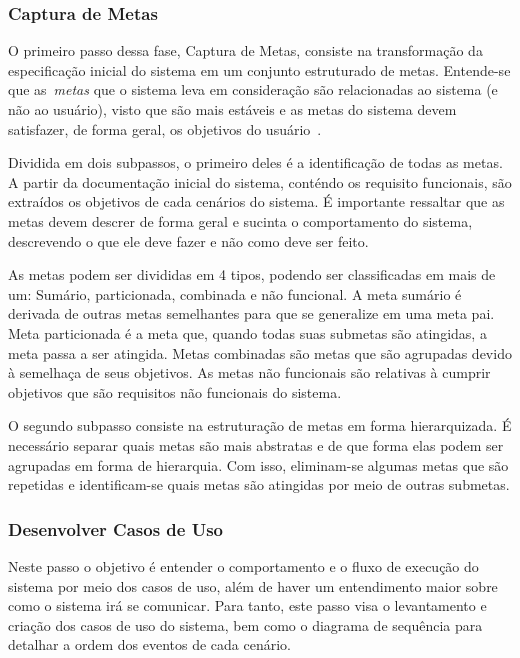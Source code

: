 \subsubsection{Captura de Metas}

O primeiro passo dessa fase, Captura de Metas, consiste na transformação da especificação inicial do sistema em um conjunto estruturado de metas. Entende-se que as~\emph{metas} que o sistema leva em consideração são relacionadas ao sistema (e não ao usuário), visto que são mais estáveis e as metas do sistema devem satisfazer, de forma geral, os objetivos do usuário~\cite{scott01}.

Dividida em dois subpassos, o primeiro deles é a identificação de todas as metas. A partir da documentação inicial do sistema, conténdo os requisito  funcionais, são extraídos os objetivos de cada cenários do sistema. É importante ressaltar que as metas devem descrer de forma geral e sucinta o comportamento do sistema, descrevendo o que ele deve fazer e não como deve ser feito.

As metas podem ser divididas em 4 tipos, podendo ser classificadas em mais de um: Sumário, particionada, combinada e não funcional. A meta sumário é derivada de outras metas semelhantes para que se generalize em uma meta pai. Meta particionada é a meta que, quando todas suas submetas são atingidas,  a meta passa a ser atingida. Metas combinadas são metas que são agrupadas devido à semelhaça de seus objetivos. As metas não funcionais são relativas à cumprir objetivos que são requisitos não funcionais do sistema.

O segundo subpasso consiste na estruturação de metas em forma hierarquizada. É necessário separar quais metas são mais abstratas e de que forma elas podem ser agrupadas em forma de hierarquia. Com isso, eliminam-se algumas metas que são repetidas e identificam-se quais metas são atingidas por meio de outras submetas.

\subsubsection{Desenvolver Casos de Uso}

Neste passo o objetivo é entender o comportamento e o fluxo de execução do sistema por meio dos casos de uso, além de haver um entendimento maior sobre como o sistema irá se comunicar. Para tanto, este passo visa o levantamento e criação dos casos de uso do sistema, bem como o diagrama de sequência para detalhar a ordem dos eventos de cada cenário.

